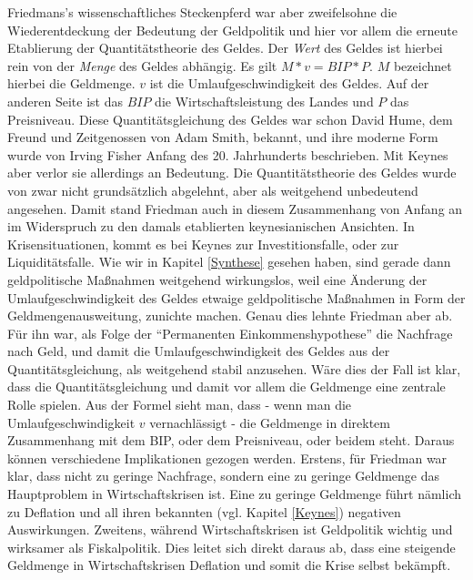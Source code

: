 Friedmans's wissenschaftliches Steckenpferd war aber zweifelsohne die Wiederentdeckung der Bedeutung der Geldpolitik und hier vor allem die erneute Etablierung der Quantitätstheorie des Geldes. Der \textit{Wert} des Geldes ist hierbei rein von der \textit{Menge} des Geldes abhängig. Es gilt $ M * v = BIP * P$. $M$ bezeichnet hierbei die Geldmenge. $v$ ist die Umlaufgeschwindigkeit des Geldes. Auf der anderen Seite ist das $BIP$ die Wirtschaftsleistung des Landes und $P$ das Preisniveau. Diese Quantitätsgleichung des Geldes war schon David Hume, dem Freund und Zeitgenossen von Adam Smith, bekannt, und ihre moderne Form wurde von Irving Fisher \parencite{Fisher1911} Anfang des 20. Jahrhunderts beschrieben. Mit Keynes aber verlor sie allerdings an Bedeutung. Die Quantitätstheorie des Geldes wurde von \textcite{Keynes1936} zwar nicht grundsätzlich abgelehnt, aber als weitgehend unbedeutend angesehen. Damit stand Friedman auch in diesem Zusammenhang von Anfang an im Widerspruch zu den damals etablierten keynesianischen Ansichten. In Krisensituationen, kommt es bei Keynes zur Investitionsfalle, oder zur Liquiditätsfalle. Wie wir in Kapitel \ref{Synthese} gesehen haben, sind gerade dann geldpolitische Maßnahmen weitgehend wirkungslos, weil eine Änderung der Umlaufgeschwindigkeit des Geldes etwaige geldpolitische Maßnahmen in Form der Geldmengenausweitung, zunichte machen. Genau dies lehnte Friedman aber ab. Für ihn war, als Folge der "`Permanenten Einkommenshypothese"' die Nachfrage nach Geld, und damit die Umlaufgeschwindigkeit des Geldes aus der Quantitätsgleichung, als weitgehend stabil anzusehen. Wäre dies der Fall ist klar, dass die Quantitätsgleichung und damit vor allem die Geldmenge eine zentrale Rolle spielen. Aus der Formel sieht man, dass - wenn man die Umlaufgeschwindigkeit $v$ vernachlässigt - die Geldmenge in direktem Zusammenhang mit dem BIP, oder dem Preisniveau, oder beidem steht. Daraus können verschiedene Implikationen gezogen werden. 
Erstens, für Friedman war klar, dass nicht zu geringe Nachfrage, sondern eine zu geringe Geldmenge das Hauptproblem in Wirtschaftskrisen ist. Eine zu geringe Geldmenge führt nämlich zu Deflation und all ihren bekannten (vgl. Kapitel \ref{Keynes}) negativen Auswirkungen.
Zweitens, während Wirtschaftskrisen ist Geldpolitik wichtig und wirksamer als Fiskalpolitik. Dies leitet sich direkt daraus ab, dass eine steigende Geldmenge in Wirtschaftskrisen Deflation und somit die Krise selbst bekämpft.
